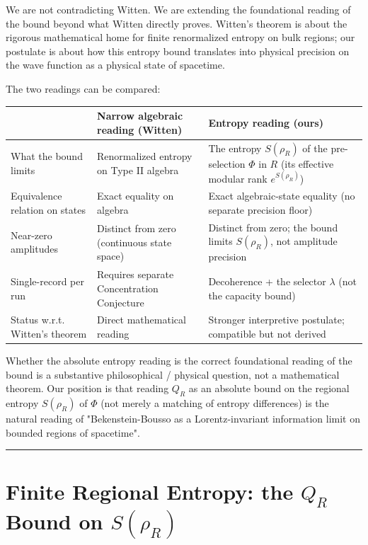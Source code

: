\documentclass[11pt,a4paper]{article}
\begin{document}
We are not contradicting Witten. We are extending the foundational reading of the bound beyond what Witten directly proves. Witten's theorem is about the rigorous mathematical home for finite renormalized entropy on bulk regions; our postulate is about how this entropy bound translates into physical precision on the wave function as a physical state of spacetime.

The two readings can be compared:

\begin{center}
\small
\begin{tabularx}{\linewidth}{|Y|Y|Y|}
\hline
\textbf{} & \textbf{Narrow algebraic reading (Witten)} & \textbf{Entropy reading (ours)} \\
\hline
What the bound limits & Renormalized entropy on Type II algebra & The entropy $S(\rho_R)$ of the pre-selection $\Phi$ in $R$ (its effective modular rank $e^{S(\rho_R)}$) \\
\hline
Equivalence relation on states & Exact equality on algebra & Exact algebraic-state equality (no separate precision floor) \\
\hline
Near-zero amplitudes & Distinct from zero (continuous state space) & Distinct from zero; the bound limits $S(\rho_R)$, not amplitude precision \\
\hline
Single-record per run & Requires separate Concentration Conjecture & Decoherence + the selector $\lambda$ (not the capacity bound) \\
\hline
Status w.r.t. Witten's theorem & Direct mathematical reading & Stronger interpretive postulate; compatible but not derived \\
\hline
\end{tabularx}
\end{center}

Whether the absolute entropy reading is the correct foundational reading of the bound is a substantive philosophical / physical question, not a mathematical theorem. Our position is that reading $Q_R$ as an absolute bound on the regional entropy $S(\rho_R)$ of $\Phi$ (not merely a matching of entropy differences) is the natural reading of "Bekenstein-Bousso as a Lorentz-invariant information limit on bounded regions of spacetime".

\medskip\hrule\medskip

\section{Finite Regional Entropy: the $Q_R$ Bound on $S(\rho_R)$}
\end{document}
